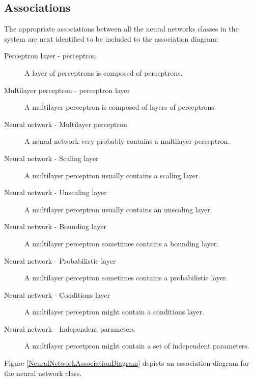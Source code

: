 \subsection*{Associations}

The appropriate associations between all the neural networks classes in the system are next identified to be included
to the association diagram:

\begin{description}

\item[Perceptron layer - perceptron] A layer of perceptrons is composed of perceptrons.

\item[Multilayer perceptron - perceptron layer] A multilayer perceptron is composed of layers of perceptrons.

\item[Neural network - Multilayer perceptron] A neural network very probably contains a multilayer perceptron.

\item[Neural network - Scaling layer] A multilayer perceptron usually contains a scaling layer. 

\item[Neural network - Unscaling layer] A multilayer perceptron usually contains an unscaling layer. 

\item[Neural network - Bounding layer] A multilayer perceptron sometimes contains a bounding layer.

\item[Neural network - Probabilistic layer] A multilayer perceptron sometimes contains a probabilistic layer.

\item[Neural network - Conditions layer] A multilayer perceptron might contain a conditions layer.

\item[Neural network - Independent parameters] A multilayer percetpron might contain a set of independent parameters.    

\end{description}

Figure \ref{NeuralNetworkAssociationDiagram} depicts an association diagram
for the neural network class. 

